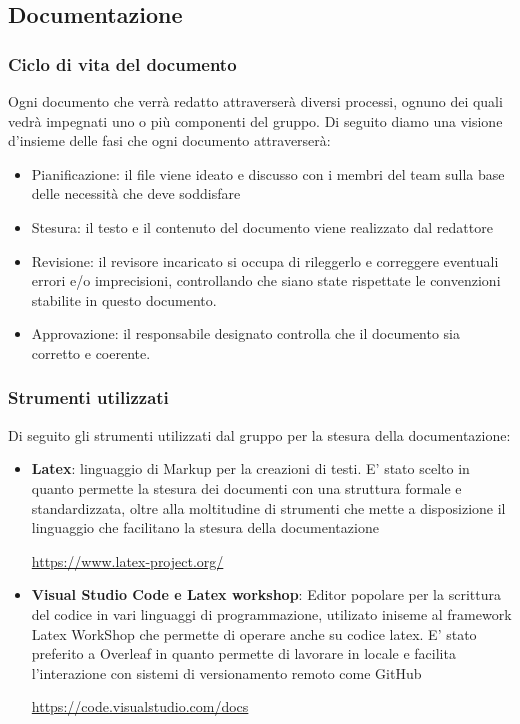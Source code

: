 \documentclass[12pt]{article}
\begin{document}
\subsection{Documentazione}
\subsubsection{Ciclo di vita del documento}
Ogni documento che verrà redatto attraverserà diversi processi, ognuno dei quali vedrà impegnati uno o più componenti del gruppo.
Di seguito diamo una visione d'insieme delle fasi che ogni documento attraverserà:
\begin{itemize}
    \item Pianificazione: il file viene ideato e discusso con i membri del team sulla base delle necessità che deve soddisfare
    \item Stesura: il testo e il contenuto del documento viene realizzato dal redattore
    \item Revisione: il revisore incaricato si occupa di rileggerlo e correggere eventuali errori e/o imprecisioni, controllando che siano state rispettate le convenzioni stabilite in questo documento.
    \item Approvazione: il responsabile designato controlla che il documento sia corretto e coerente.
\end{itemize}

\subsubsection{Strumenti utilizzati}
Di seguito gli strumenti utilizzati dal gruppo per la stesura della documentazione:
\begin{itemize}
    \item \textbf{Latex}: linguaggio di Markup per la creazioni di testi. E' stato scelto in quanto permette la stesura dei documenti con una struttura formale e standardizzata, oltre alla moltitudine di strumenti che mette a disposizione il linguaggio che facilitano la stesura della documentazione
    \begin{center}
        \url{https://www.latex-project.org/}
    \end{center}
    \item \textbf{Visual Studio Code e Latex workshop}: Editor popolare per la scrittura del codice in vari linguaggi di programmazione, utilizato iniseme al framework Latex WorkShop che permette di operare anche su codice latex. E' stato preferito a Overleaf in quanto permette di lavorare in locale e facilita l'interazione con sistemi di versionamento remoto come GitHub
    \begin{center}  
        \url{https://code.visualstudio.com/docs}
    \end{center}
\end{itemize}
\end{document}
